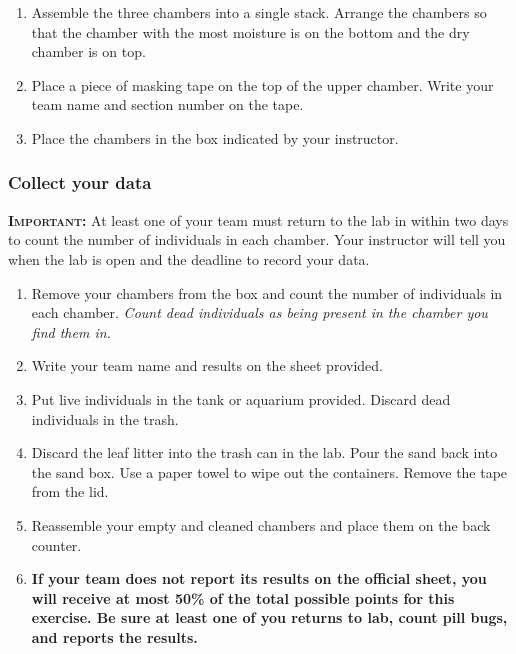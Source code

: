 \documentclass[12pt, hidelinks]{exam}
\begin{document}
\begin{questions}
\begin{enumerate}
	\item Assemble the three chambers into a single stack. Arrange the chambers so that the chamber with the most moisture is on the bottom and the dry chamber is on top. 
	
	\item Place a piece of masking tape on the top of the upper chamber. Write your team name and section number on the tape.
	
	\item Place the chambers in the box indicated by your instructor.
	
\end{enumerate}

\subsubsection*{Collect your data}


{\scshape \textbf{Important:}} At least one of your team must return to the lab in within two days to count the number of individuals in each chamber. Your instructor will tell you when the lab is open and the deadline to record your data. 

\begin{enumerate}
	\item Remove your chambers from the box and count the number of individuals in each chamber. \emph{Count dead individuals as being present in the chamber you find them in.}
	
	\item Write your team name and results on the sheet provided.
	
	\item Put live individuals in the tank or aquarium provided. Discard dead individuals in the trash.
	
	\item Discard the leaf litter into the trash can in the lab. Pour the sand back into the sand box. Use a paper towel to wipe out the containers. Remove the tape from the lid.
	
	\item Reassemble your empty and cleaned chambers and place them on the back counter. 
	
	\item \textbf{If your team does not report its results on the official sheet, you will receive at most 50\% of the total possible points for this exercise. Be sure at least one of you returns to lab, count pill bugs, and reports the results.}
		

\end{enumerate}
\end{questions}
\end{document}

